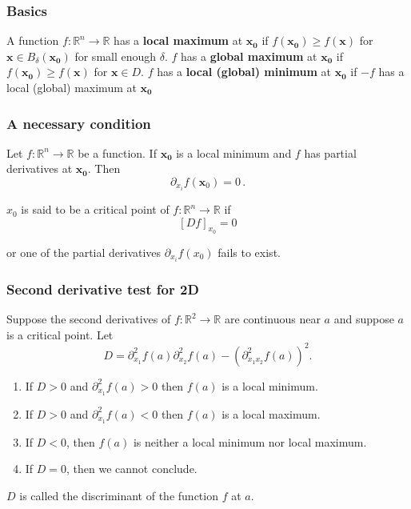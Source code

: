 \documentclass[aspectratio=169]{beamer}
\newcommand{\R}{\mathbb{R}}
\begin{document}
\begin{frame}
    \frametitle{Basics}
\begin{definition}
A function \(f:\R^n \to \mathbb{R}\) has a \textbf{local maximum} at \(\mathbf{x_0}\) if
\(f(\mathbf{x_0}) \geq f(\mathbf{x})\) for \(\mathbf{x} \in B_\delta(\mathbf{x_0})\) for small enough \(\delta\).
\(f\) has a \textbf{global maximum} at \(\mathbf{x_0}\) if
\(f(\mathbf{x_0}) \geq f(\mathbf{x})\) for \(\mathbf{x} \in D\).
\(f\) has a \textbf{local (global) minimum} at \(\mathbf{x_0}\) if
\(-f\) has a local (global) maximum at \(\mathbf{x_0}\)
\end{definition}

\end{frame}


\begin{frame}
    \frametitle{A necessary condition}
\begin{theorem}
Let \(f:\R^n \to \mathbb{R}\) be a function.
If \(\mathbf{x_0}\) is a local minimum and \(f\) has partial derivatives at \(\mathbf{x_0}\).
Then
\begin{equation*}
    \partial_{x_i} f(\mathbf{x}_0) = 0 \,.
\end{equation*}
\end{theorem}
\end{frame}

\begin{frame}
    \begin{definition}
        $x_0$ is said to be a critical point of $f: \R^n \to \R$ if
        $$[D f]_{x_0} = 0$$
    \end{definition}
    or one of the partial derivatives $\partial_{x_i} f(x_0)$ fails to exist.
\end{frame}

\begin{frame}
    \frametitle{Second derivative test for 2D}
    Suppose the second derivatives of $f:\R^2 \to \R$ are continuous near $a$ and
    suppose $a$ is a critical point. Let
    $$ D = \partial_{x_1}^2 f(a)\partial_{x_2}^2 f(a) - (\partial_{x_1 x_2}^2 f (a))^2. $$
    \begin{enumerate}
        \item If $D>0$ and $\partial_{x_1}^2 f(a) > 0$ then $f(a)$ is a local minimum.
        \item If $D>0$ and $\partial_{x_1}^2 f(a) < 0$ then $f(a)$ is a local maximum.
        \item If $D<0$, then $f(a)$ is neither a local minimum nor local maximum.
        \item If $D = 0$, then we cannot conclude.
    \end{enumerate}
    $D$ is called the discriminant of the function $f$ at $a$.
\end{frame}
\end{document}
